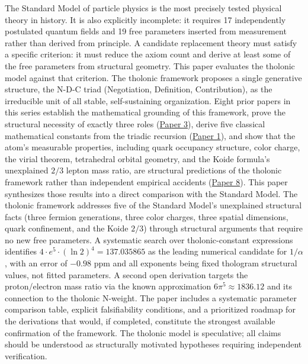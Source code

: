\documentclass[
  11pt,
  letterpaper,
]{article}
\begin{document}
The Standard Model of particle physics is the most precisely tested
physical theory in history. It is also explicitly incomplete: it
requires 17 independently postulated quantum fields and 19 free
parameters inserted from measurement rather than derived from principle.
A candidate replacement theory must satisfy a specific criterion: it
must reduce the axiom count and derive at least some of the free
parameters from structural geometry. This paper evaluates the tholonic
model against that criterion. The tholonic framework proposes a single
generative structure, the N-D-C triad (Negotiation, Definition,
Contribution), as the irreducible unit of all stable, self-sustaining
organization. Eight prior papers in this series establish the
mathematical grounding of this framework, prove the structural necessity
of exactly three roles
(\href{https://github.com/baardev/truevalue/blob/main/docnav/Research/papers/3_minimal-recursive-triadic-framework/3_minimal-recursive-triadic-framework.pdf}{Paper
3}), derive five classical mathematical constants from the triadic
recursion
(\href{https://github.com/baardev/truevalue/blob/main/docnav/Research/papers/1_recursive-tholonic-five-constants/1_recursive-tholonic-five-constants.pdf}{Paper
1}), and show that the atom's measurable properties, including quark
occupancy structure, color charge, the virial theorem, tetrahedral
orbital geometry, and the Koide formula's unexplained \(2/3\) lepton
mass ratio, are structural predictions of the tholonic framework rather
than independent empirical accidents
(\href{https://github.com/baardev/truevalue/blob/main/docnav/Research/papers/8_atom-as-tholon-measurable-phenomena/8_atom-as-tholon-measurable-phenomena.pdf}{Paper
8}). This paper synthesizes those results into a direct comparison with
the Standard Model. The tholonic framework addresses five of the
Standard Model's unexplained structural facts (three fermion
generations, three color charges, three spatial dimensions, quark
confinement, and the Koide \(2/3\)) through structural arguments that
require no new free parameters. A systematic search over
tholonic-constant expressions identifies
\(4 \cdot e^5 \cdot (\ln 2)^4 = 137.035865\) as the leading numerical
candidate for \(1/\alpha\), with an error of \(-0.98\) ppm and all
exponents being fixed thologram structural values, not fitted
parameters. A second open derivation targets the proton/electron mass
ratio via the known approximation \(6\pi^5 \approx 1836.12\) and its
connection to the tholonic N-weight. The paper includes a systematic
parameter comparison table, explicit falsifiability conditions, and a
prioritized roadmap for the derivations that would, if completed,
constitute the strongest available confirmation of the framework. The
tholonic model is speculative; all claims should be understood as
structurally motivated hypotheses requiring independent verification.
\end{document}
